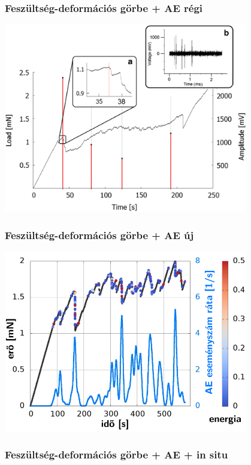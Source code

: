 \documentclass[12pt]{beamer}
\begin{document}
\begin{frame}
\frametitle{Feszültség-deformációs görbe + AE régi}
\begin{center}
\includegraphics[width=0.8\textwidth]{figs/Micron-Scale_Deformation3.jpg} 
\end{center}
\end{frame}

\begin{frame}
\frametitle{Feszültség-deformációs görbe + AE új}
\begin{center}
\includegraphics[width=0.8\textwidth]{figs/frame.png} 
\end{center}
\end{frame}
\begin{frame}
\frametitle{Feszültség-deformációs görbe + AE + in situ}
\begin{center}


\end{center}
\end{frame}
\end{document}
